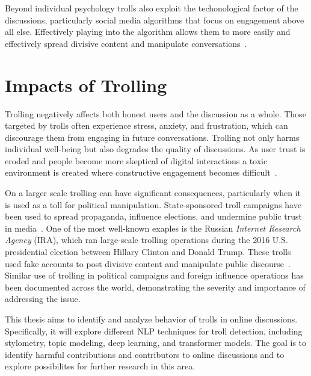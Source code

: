 \documentclass[twoside]{ctuthesis}
\theoremstyle{plain}
\theoremstyle{definition}
\theoremstyle{note}
\begin{document}
Beyond individual psychology trolls also exploit the techonological factor of the discussions, particularly social media algorithms that focus on engagement above all else. Effectively playing into the algorithm allows them to more easily and effectively spread divisive content and manipulate conversations~\cite{GolfPapez2017DontFeedTheTroll}.\par

\section{Impacts of Trolling}
Trolling negatively affects both honest users and the discussion as a whole. Those targeted by trolls often experience stress, anxiety, and frustration, which can discourage them from engaging in future conversations. Trolling not only harms individual well-being but also degrades the quality of discussions. As user trust is eroded and people become more skeptical of digital interactions a toxic environment is created where constructive engagement becomes difficult~\cite{GolfPapez2017DontFeedTheTroll}.\par

On a larger scale trolling can have significant consequences, particularly when it is used as a toll for political manipulation. State-sponsored troll campaigns have been used to spread propaganda, influence elections, and undermine public trust in media~\cite{Bradshaw2017TroopsTrolls}. One of the most well-known exaples is the Russian \textit{Internet Research Agency} (IRA), which ran large-scale trolling operations during the 2016 U.S. presidential election between Hillary Clinton and Donald Trump. These trolls used fake accounts to post divisive content and manipulate public discourse~\cite{Linvill2020IRATrolls}. Similar use of trolling in political campaigns and foreign influence operations has been documented across the world, demonstrating the severity and importance of addressing the issue.\par

This thesis aims to identify and analyze behavior of trolls in online discussions. Specifically, it will explore different NLP techniques for troll detection, including stylometry, topic modeling, deep learning, and transformer models. The goal is to identify harmful contributions and contributors to online discussions and to explore possibilites for further research in this area.\par

\end{document}

